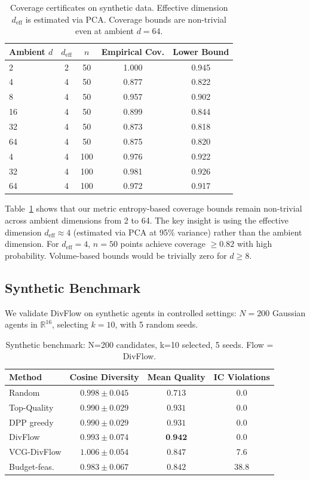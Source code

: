 \documentclass[10pt]{article}
\begin{document}
\begin{table}[t]
\centering
\caption{Coverage certificates on synthetic data. Effective dimension $d_{\text{eff}}$ is estimated via PCA. Coverage bounds are non-trivial even at ambient $d=64$.}
\label{tab:coverage}
\begin{tabular}{lcccc}
\toprule
\textbf{Ambient $d$} & \textbf{$d_{\text{eff}}$} & \textbf{$n$} & \textbf{Empirical Cov.} & \textbf{Lower Bound} \\
\midrule
2   & 2  & 50  & 1.000 & 0.945 \\
4   & 4  & 50  & 0.877 & 0.822 \\
8   & 4  & 50  & 0.957 & 0.902 \\
16  & 4  & 50  & 0.899 & 0.844 \\
32  & 4  & 50  & 0.873 & 0.818 \\
64  & 4  & 50  & 0.875 & 0.820 \\
\midrule
4   & 4  & 100 & 0.976 & 0.922 \\
32  & 4  & 100 & 0.981 & 0.926 \\
64  & 4  & 100 & 0.972 & 0.917 \\
\bottomrule
\end{tabular}
\end{table}

Table~\ref{tab:coverage} shows that our metric entropy-based coverage bounds remain non-trivial across ambient dimensions from 2 to 64.
The key insight is using the effective dimension $d_{\text{eff}} \approx 4$ (estimated via PCA at 95\% variance) rather than the ambient dimension.
For $d_{\text{eff}} = 4$, $n=50$ points achieve coverage $\geq 0.82$ with high probability.
Volume-based bounds would be trivially zero for $d \geq 8$.

\subsection{Synthetic Benchmark}
\label{sec:synthetic}

We validate DivFlow on synthetic agents in controlled settings: $N=200$ Gaussian agents in $\mathbb{R}^{16}$, selecting $k=10$, with 5 random seeds.

\begin{table}[t]
\centering
\caption{Synthetic benchmark: N=200 candidates, k=10 selected, 5 seeds. Flow = DivFlow.}
\label{tab:synthetic}
\begin{tabular}{lccc}
\toprule
\textbf{Method} & \textbf{Cosine Diversity} & \textbf{Mean Quality} & \textbf{IC Violations} \\
\midrule
Random       & $0.998 \pm 0.045$ & $0.713$ & 0.0 \\
Top-Quality  & $0.990 \pm 0.029$ & $0.931$ & 0.0 \\
DPP greedy   & $0.990 \pm 0.029$ & $0.931$ & 0.0 \\
DivFlow      & $0.993 \pm 0.074$ & $\textbf{0.942}$ & 0.0 \\
VCG-DivFlow  & $1.006 \pm 0.054$ & $0.847$ & 7.6 \\
Budget-feas. & $0.983 \pm 0.067$ & $0.842$ & 38.8 \\
\bottomrule
\end{tabular}
\end{table}
\end{document}
